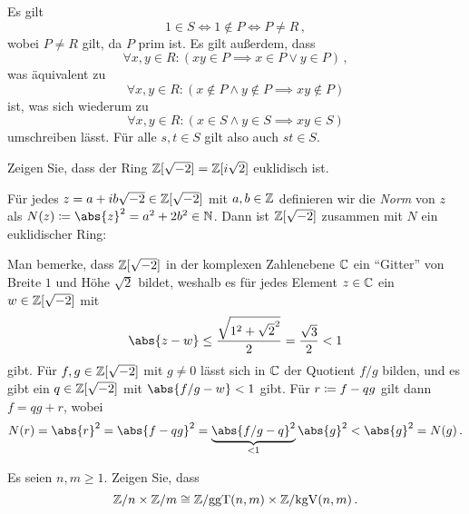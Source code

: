 \documentclass[a4paper, 10pt]{scrartcl}
\begin{document}
\begin{solution}
  Es gilt
  \[
          1 \in S
    \iff  1 \notin P
    \iff  P \neq R \,,
  \]
  wobei $P \neq R$ gilt, da $P$ prim ist.
  Es gilt außerdem, dass
  \[
    \forall x, y \in R:
    (xy \in P \implies x \in P \vee y \in P) \,,
  \]
  was äquivalent zu
  \[
    \forall x, y \in R:
    ( x \notin P \wedge y \notin P \implies xy \notin P)
  \]
  ist, was sich wiederum zu
  \[
    \forall x, y \in R:
    ( x \in S \wedge y \in S \implies xy \in S )
  \]
  umschreiben lässt.
  Für alle $s, t \in S$ gilt also auch $st \in S$.
\end{solution}

\begin{question}
  Zeigen Sie, dass der Ring $\mathbb{Z}[\sqrt{-2}] = \mathbb{Z}[i\sqrt{2}]$ euklidisch ist.
\end{question}

\begin{solution}
  Für jedes $z = a + i b \sqrt{-2} \in \mathbb{Z}[\sqrt{-2}]$ mit $a, b \in \mathbb{Z}$ definieren wir die \emph{Norm} von $z$ als $N(z) \defined \abs{z}^2 = a^2 + 2 b^2 \in \Natural$.
  Dann ist $\mathbb{Z}[\sqrt{-2}]$ zusammen mit $N$ ein euklidischer Ring:
  
  Man bemerke, dass $\mathbb{Z}[\sqrt{-2}]$ in der komplexen Zahlenebene $\mathbb{C}$ ein \enquote{Gitter} von Breite $1$ und Höhe $\sqrt{2}$ bildet, weshalb es für jedes Element $z \in \mathbb{C}$ ein $w \in \mathbb{Z}[\sqrt{-2}]$ mit
  \[
          \abs{z - w}
    \leq  \frac{\sqrt{1^2 + \sqrt{2}^2}}{2}
    =     \frac{\sqrt{3}}{2} < 1
  \]
  gibt.
  Für $f, g \in \mathbb{Z}[\sqrt{-2}]$ mit $g \neq 0$ lässt sich in $\mathbb{C}$ der Quotient $f/g$ bilden, und es gibt ein $q \in \mathbb{Z}[\sqrt{-2}]$ mit $\abs{f/g - w} < 1$ gibt.
  Für $r \coloneqq f - qg$ gilt dann $f = qg + r$, wobei
  \[
      N(r)
    = \abs{r}^2
    = \abs{f - qg}^2
    = \underbrace{\abs{f/g - q}^2}_{<1} \abs{g}^2
    < \abs{g}^2
    = N(g) \,.
  \]
\end{solution}

\begin{question}
  Es seien $n, m \geq 1$.
  Zeigen Sie, dass
  \[
          \mathbb{Z}/n \times \mathbb{Z}/m
    \cong \mathbb{Z}/{\operatorname{ggT}(n,m)} \times \mathbb{Z}/{\operatorname{kgV}(n,m)} \,.
  \]
\end{question}
\end{document}

